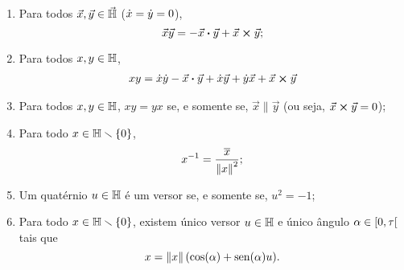 \begin{proposition}
	\begin{enumerate}
	\item Para todos $\vec{x},\vec{y} \in \vec{\mathbb{H}}$ ($\dot{x} = \dot{y} = 0$),
		\begin{equation*}
		\vec{x}\vec{y} = - {\vec{x}} \bm{\cdot} {\vec{y}} + {\vec{x}} \bm{\times} {\vec{y}};
		\end{equation*}
	\item Para todos $x,y \in \mathbb{H}$,
		\begin{align*}
		xy &= \dot{x}\dot{y} - {\vec{x}} \bm{\cdot} {\vec{y}}+\dot{x}\vec{y}+\dot{y}\vec{x}+{\vec{x}} \bm{\times} {\vec{y}} \\
		\end{align*}
	
	\item Para todos $x,y \in \mathbb{H}$, $xy=yx$ se, e somente se, $\vec{x} \parallel \vec{y}$ (ou seja, ${\vec{x}} \bm{\times} {\vec{y}}=0$);
	
	\item Para todo $x \in \mathbb{H} \smallsetminus \{0\}$,
		\begin{equation*}
		x^{-1} = \frac{\overline{x}}{\left\Vert{x}\right\Vert^2};
		\end{equation*}
	
	\item Um quatérnio $u \in \mathbb{H}$ é um versor se, e somente se, $u^2=-1$;
	
	\item Para todo $x \in \mathbb{H} \smallsetminus \{0\}$, existem único versor $u \in \mathbb{H}$ e único ângulo $\alpha \in \left[{0},{\tau}\right[$ tais que
		\begin{equation*}
		x=\left\Vert{x}\right\Vert(\cos(\alpha) + \operatorname{sen}(\alpha) u).
		\end{equation*}
	\end{enumerate}
\end{proposition}
